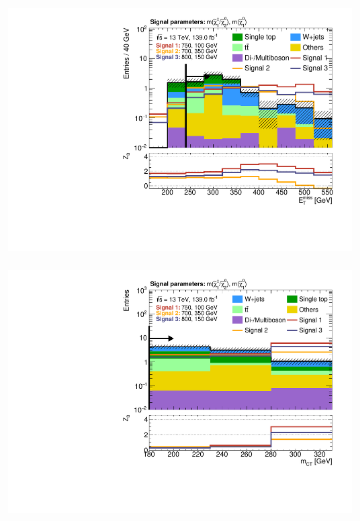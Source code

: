 \begin{figure}
	\centering
	\begin{subfigure}[b]{0.4\linewidth}
		\centering\includegraphics[width=\textwidth]{n1_SRHM_mct_bins/met.pdf}
		\caption{\label{fig:Wh_reopt_second_round_n1_srhm_met}}
	\end{subfigure}%
	\begin{subfigure}[b]{0.4\linewidth}
		\centering\includegraphics[width=\textwidth]{n1_SRHM_mct_bins/mct.pdf}
		\caption{\label{fig:Wh_reopt_second_round_n1_srhm_mct}}
	\end{subfigure}
	\begin{subfigure}[b]{0.4\linewidth}

\end{subfigure}
\end{figure}

